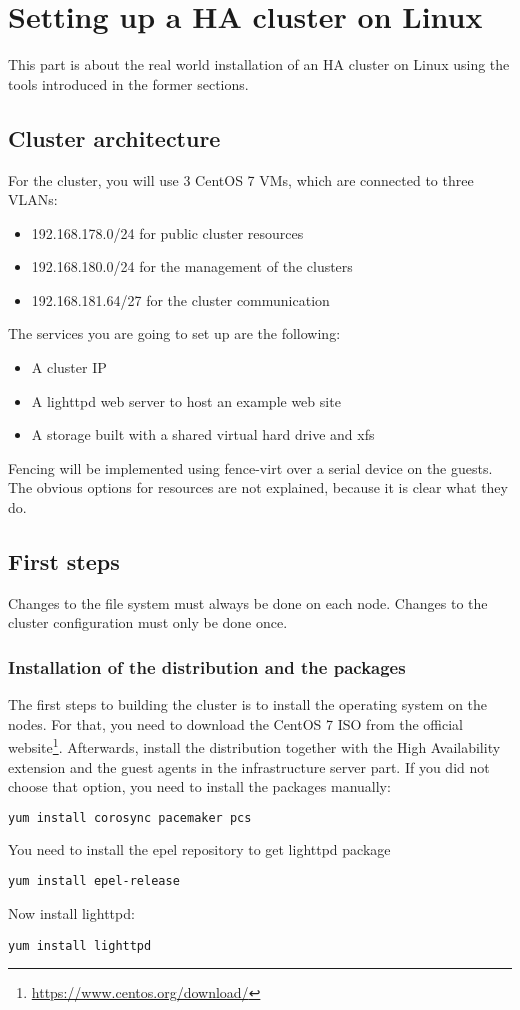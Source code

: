 \section{Setting up a HA cluster on Linux}
This part is about the real world installation of an \ac{HA} cluster on Linux using the tools introduced in the former sections.

\subsection{Cluster architecture}
For the cluster, you will use 3 CentOS 7 \acp{VM}, which are connected
to three \acp{VLAN}: 
\begin{itemize}
\item 192.168.178.0/24 for public cluster resources
\item 192.168.180.0/24 for the management of the clusters
\item 192.168.181.64/27 for the cluster communication
\end{itemize}
The services you are going to set up are the following:
\begin{itemize}
\item A cluster IP
\item A lighttpd web server to host an example web site
\item A storage built with a shared virtual hard drive and xfs
\end{itemize}

Fencing will be implemented using fence-virt over a serial device
on the guests.
The obvious options for resources are not explained, because it is clear what they
do.
\subsection{First steps}

Changes to the file system must always be done on each node.
Changes to the cluster configuration must only be done once.
\subsubsection{Installation of the distribution and the packages}
The first steps to building the cluster is to install the operating system on the nodes.
For that, you need to download the CentOS 7 ISO from the official website\footnote{\url{https://www.centos.org/download/}}.
Afterwards, install the distribution together with the High Availability extension
and the guest agents in the infrastructure server part.
If you did not choose that option, you need to install the packages manually:
\begin{lstlisting}[language=sh]
yum install corosync pacemaker pcs
\end{lstlisting}
You need to install the \ac{epel} repository to get lighttpd package
\begin{lstlisting}
yum install epel-release
\end{lstlisting}
Now install lighttpd:
\begin{lstlisting}
yum install lighttpd
\end{lstlisting}
